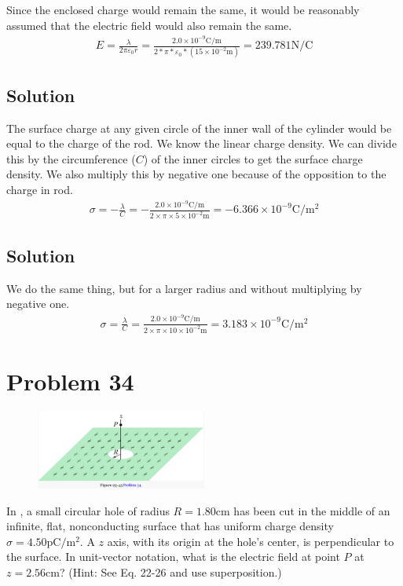 \documentclass[12pt]{article}
\begin{document}
Since the enclosed charge would remain the same, it would be reasonably assumed that the electric field would also remain the same.
\begin{gather*}
    E   =   \frac{\lambda}{2\pi\varepsilon_0 r}
        =   \frac{2.0 \times 10^{-9} \unit{\coulomb/\meter}}{2*\pi*\varepsilon_0*(15 \times 10^{-2} \unit{\meter})}
        =   \boxed{239.781 \unit{\newton/\coulomb}}
\end{gather*}

\subsection{Solution}
The surface charge at any given circle of the inner wall of the cylinder would be equal to the charge of the rod. We know the linear charge density. We can divide this by the circumference ($C$) of the inner circles to get the surface charge density. We also multiply this by negative one because of the opposition to the charge in rod.
\begin{gather*}
    \sigma  =   -\frac{\lambda}{C}
        =   -\frac{2.0 \times 10^{-9}\unit{\coulomb/\meter}}{2\times \pi \times 5 \times 10^{-2} \unit{\meter}}
        =   \boxed{-6.366 \times 10^{-9} \unit{\coulomb/\meter^2}}
\end{gather*}

\subsection{Solution}
We do the same thing, but for a larger radius and without multiplying by negative one. 
\begin{gather*}
    \sigma  =   \frac{\lambda}{C}
        =   \frac{2.0 \times 10^{-9}\unit{\coulomb/\meter}}{2\times \pi \times 10 \times 10^{-2} \unit{\meter}}
        =   \boxed{3.183 \times 10^{-9} \unit{\coulomb/\meter^2}}
\end{gather*}

\pagebreak
\section{Problem 34}
\begin{figure}
    \vspace{-30pt}
    \includegraphics[width=0.5\textwidth]{picture_10.png} 
\end{figure}
In , a small circular hole of radius $R = 1.80 \unit{\centi\meter}$ has been cut in the middle of an infinite, flat, nonconducting surface that has uniform charge density $\sigma = 4.50 \unit{\pico\coulomb/\meter^2}$. A $z$ axis, with its origin at the hole's center, is perpendicular to the surface. In unit-vector notation, what is the electric field at point $P$ at $z = 2.56 \unit{\centi\meter}$? (Hint: See Eq. 22-26 and use superposition.)
\end{document}
